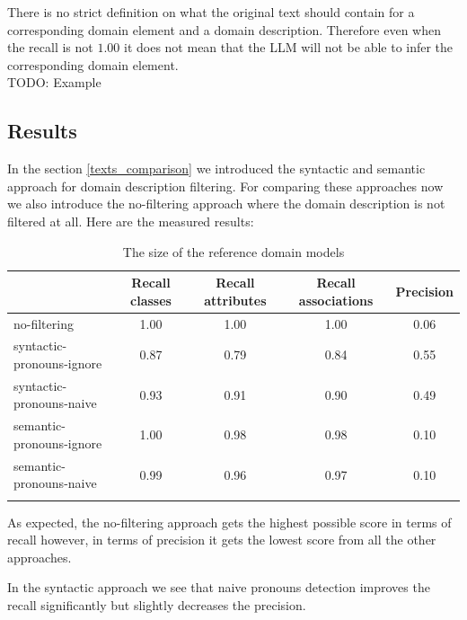 There is no strict definition on what the original text should contain for a corresponding domain element and a domain description. Therefore even when the recall is not $1.00$ it does not mean that the LLM will not be able to infer the corresponding domain element. \\

TODO: Example \\


\subsection{Results}

In the section \ref{texts_comparison} we introduced the syntactic and semantic approach for domain description filtering. For comparing these approaches now we also introduce the no-filtering approach where the domain description is not filtered at all. Here are the measured results:

\begin{table}[!h]
    \scriptsize
    \centering
    \setlength{\tabcolsep}{0.5em}
    \begin{tabular}{lcccc}

    \toprule
         & Recall classes & Recall attributes & Recall associations & Precision \\
    \toprule
    
    \addlinespace
         no-filtering      & 1.00  & 1.00  & 1.00 & 0.06 \\
    	 syntactic-pronouns-ignore & 0.87 & 0.79 & 0.84 & 0.55 \\
         syntactic-pronouns-naive & 0.93  & 0.91  & 0.90 & 0.49 \\
         semantic-pronouns-ignore & 1.00 & 0.98 & 0.98 & 0.10 \\
         semantic-pronouns-naive & 0.99 & 0.96 & 0.97 & 0.10 \\
    \addlinespace
    \bottomrule
    \addlinespace
    \end{tabular}
    \caption{The size of the reference domain models}
    \label{tab:filtering-results}
\end{table}

As expected, the no-filtering approach gets the highest possible score in terms of recall however, in terms of precision it gets the lowest score from all the other approaches.

In the syntactic approach we see that naive pronouns detection improves the recall significantly but slightly decreases the precision.

